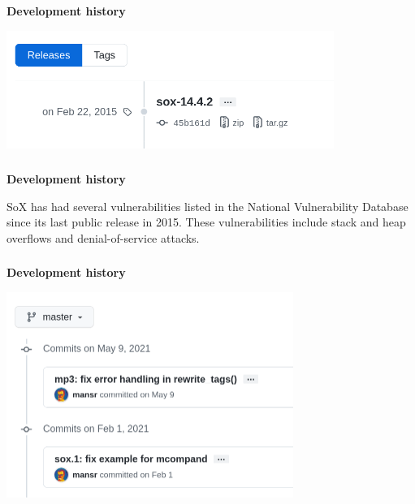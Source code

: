 \documentclass[usenames,dvipsnames, 18pt, compress, aspectratio=169]{beamer}
\begin{document}
\begin{frame}[fragile]{}
    \frametitle{}
    \begin{center}
        \textbf{Development history}
        \vspace{0.2cm}

        \includegraphics[width=0.8\textwidth]{sox-releases.png}

    \end{center}
\end{frame}

\begin{frame}[fragile]{}
    \frametitle{}
    \begin{center}
        \textbf{Development history}
        \vspace{0.2cm}

        \begin{flushleft}
        SoX has had several vulnerabilities listed in the National
        Vulnerability Database since its last public release in 2015. These
        vulnerabilities include stack and heap overflows and denial-of-service
        attacks.
        \end{flushleft}

    \end{center}
\end{frame}

\begin{frame}[fragile]{}
    \frametitle{}
    \begin{center}
        \textbf{Development history}
        \vspace{0.2cm}

        \includegraphics[width=0.7\textwidth]{sox-commits.png}

    \end{center}
\end{frame}
\end{document}
